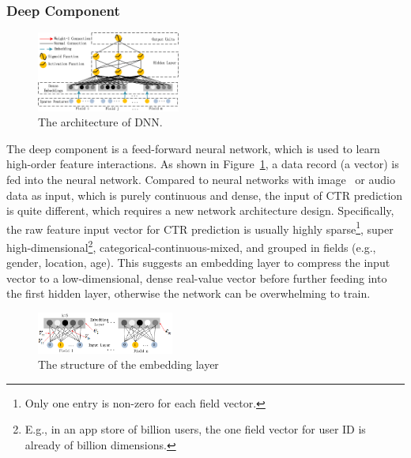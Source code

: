 \subsubsection{Deep Component}\label{section:App:model:dnn}
\begin{figure}[ht]
\setlength{\abovecaptionskip}{0pt}%
\setlength{\belowcaptionskip}{-10pt}
\centering
\includegraphics[width=0.42\textwidth]{img/architecture-dnn.png}
\caption{\footnotesize{The architecture of DNN.}}\label{fig:dnn}
\end{figure}
The deep component is a feed-forward neural network, which is used to learn high-order feature interactions. As shown in Figure~\ref{fig:dnn}, a data record (a vector) is fed into the neural network. Compared to neural networks with image~\cite{residual2016} or audio~\cite{audioBoulanger-LewandowskiBV13} data as input, which is purely continuous and dense, the input of CTR prediction is quite different, which requires a new network architecture design. Specifically, the raw feature input vector for CTR prediction is usually highly sparse\footnote{Only one entry is non-zero for each field vector.}, super high-dimensional\footnote{E.g., in an app store of billion users, the one field vector for user ID is already of billion dimensions.}, categorical-continuous-mixed, and grouped in fields (e.g., gender, location, age). This suggests an embedding layer to compress the input vector to a low-dimensional, dense real-value vector before further feeding into the first hidden layer, otherwise the network can be overwhelming to train.
\begin{figure}[ht]
\setlength{\abovecaptionskip}{0pt}%
\setlength{\belowcaptionskip}{-10pt}
\begin{center}
\includegraphics[width=0.40\textwidth]{img/embedding.png}
\caption{\footnotesize{The structure of the embedding layer}}\label{fig:embed}
\end{center}
\end{figure}

